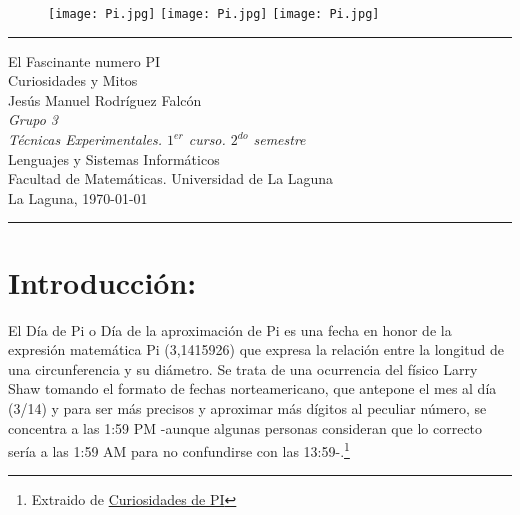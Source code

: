 \documentclass[a4paper,12pt]{article}
\theoremstyle{definition}
\theoremstyle{remark}
\newcommand{\HRule}{\rule{\linewidth}{1mm}}
\begin{document}

\pagestyle{empty}
\thispagestyle{empty}




\begin{figure}[h]
\centering
\texttt{[image: Pi.jpg]}
\texttt{[image: Pi.jpg]}
\texttt{[image: Pi.jpg]}

\end{figure}


\HRule

\begin{center}
        {\Huge El Fascinante numero PI} \\[2.5mm] 
        {\Huge Curiosidades y Mitos} \\[2.5mm]
        {\Large Jesús Manuel Rodríguez Falcón} \\[5mm]
        {\Large \textit{Grupo 3 }} \\[5mm]


        {\em Técnicas Experimentales. $1^{er}$ curso. $2^{do}$ semestre} \\[5mm]
        Lenguajes y Sistemas Informáticos \\[5mm]
        Facultad de Matemáticas.  Universidad de La Laguna  \\
        
        La Laguna, \today 
\end{center}

\HRule

\pagestyle{myheadings} %



\begin{abstract}

\end{abstract}



\section {Introducción:}
 El Día de Pi o Día de la aproximación de Pi es una fecha en honor de la expresión matemática Pi (3,1415926) que expresa la relación entre la longitud de una circunferencia y su diámetro. Se trata de una ocurrencia del físico Larry Shaw tomando el formato de fechas norteamericano, que antepone el mes al día (3/14) y para ser más precisos y aproximar más dígitos al peculiar número, se concentra a las 1:59 PM -aunque algunas personas consideran que lo correcto sería a las 1:59 AM para no confundirse con las 13:59-.\footnote{Extraido de \href{http://www.europapress.es/portaltic/portalgeek/noticia-10-curiosidades-matematicas-celebrar-dia-pi-20140314121115.html}{Curiosidades de PI}}\\
\end{document}

